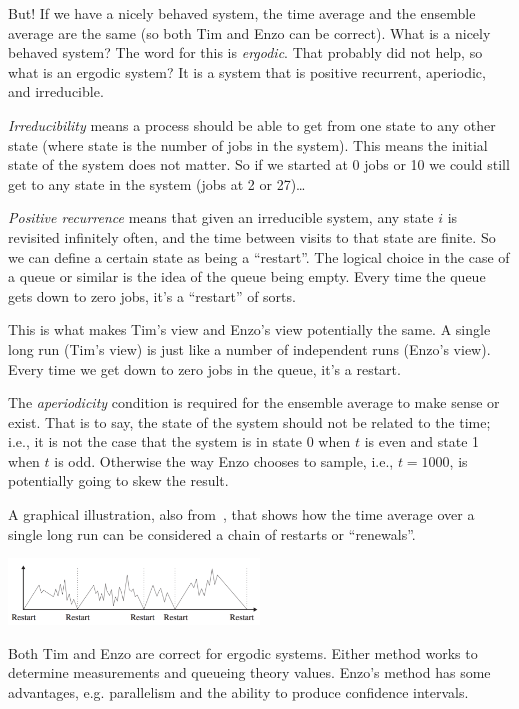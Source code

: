 But! If we have a nicely behaved system, the time average and the ensemble average are the same (so both Tim and Enzo can be correct). What is a nicely behaved system? The word for this is \textit{ergodic}. That probably did not help, so what is an ergodic system? It is a system that is positive recurrent, aperiodic, and irreducible.

\textit{Irreducibility} means a process should be able to get from one state to any other state (where state is the number of jobs in the system). This means the initial state of the system does not matter. So if we started at 0 jobs or 10 we could still get to any state in the system (jobs at 2 or 27)\ldots

\textit{Positive recurrence} means that given an irreducible system, any state $i$ is revisited infinitely often, and the time between visits to that state are finite. So we can define a certain state as being a ``restart''. The logical choice in the case of a queue or similar is the idea of the queue being empty. Every time the queue gets down to zero jobs, it's a ``restart'' of sorts. 

This is what makes Tim's view and Enzo's view potentially the same. A single long run (Tim's view) is just like a number of independent runs (Enzo's view). Every time we get down to zero jobs in the queue, it's a restart. 

The \textit{aperiodicity} condition is required for the ensemble average to make sense or exist. That is to say, the state of the system should not be related to the time; i.e., it is not the case that the system is in state 0 when $t$ is even and state 1 when $t$ is odd. Otherwise the way Enzo chooses to sample, i.e., $t = 1000$, is potentially going to skew the result.

A graphical illustration, also from~\cite{pmd}, that shows how the time average over a single long run can be considered a chain of restarts or ``renewals''.

\begin{center}
	\includegraphics[width=0.5\textwidth]{images/systemrestart.png}
\end{center}

Both Tim and Enzo are correct for ergodic systems. Either method works to determine measurements and queueing theory values. Enzo's method has some advantages, e.g. parallelism and the ability to produce confidence intervals.


